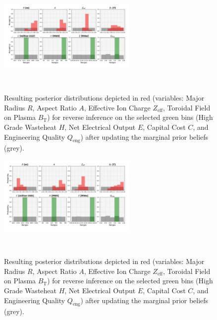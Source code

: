 \begin{figure}[ht]
    \centering
    \includegraphics[width=0.6\textwidth]{figures/TE_results/march_data/config(57)_outputs(4)5.png}
    \caption{Resulting posterior distributions depicted in red (variables: Major Radius $R$, Aspect Ratio $A$, Effective Ion Charge $Z_{\text{eff}}$, Toroidal Field on Plasma $B_{\text{T}}$) for reverse
    inference on the selected green bins (High Grade Wasteheat $H$, Net Electrical Output $E$, Capital Cost $C$, and Engineering Quality $Q_{\text{eng}}$) after updating the marginal prior beliefs (grey).}~\label{fig:config(57)_outputs(4)5}
\end{figure}

\begin{figure}[ht]
    \centering
    \includegraphics[width=0.6\textwidth]{figures/TE_results/march_data/config(57)_outputs(4)9.png}
    \caption{Resulting posterior distributions depicted in red (variables: Major Radius $R$, Aspect Ratio $A$, Effective Ion Charge $Z_{\text{eff}}$, Toroidal Field on Plasma $B_{\text{T}}$) for reverse
    inference on the selected green bins (High Grade Wasteheat $H$, Net Electrical Output $E$, Capital Cost $C$, and Engineering Quality $Q_{\text{eng}}$) after updating the marginal prior beliefs (grey).}~\label{fig:config(57)_outputs(4)9}
\end{figure}